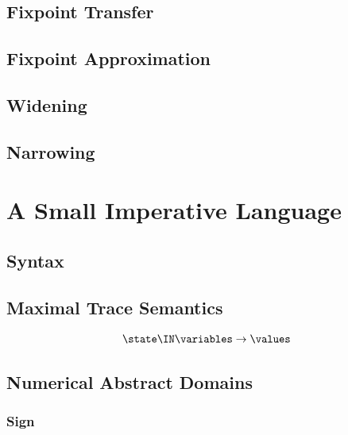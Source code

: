 \subsection{Fixpoint Transfer}

\subsection{Fixpoint Approximation}

\subsection{Widening}

\subsection{Narrowing}


\section{A Small Imperative Language}

\subsection{Syntax}

\subsection{Maximal Trace Semantics}


\begin{definition}[State]
  \begin{align*}
    \state \IN \variables \to \values
  \end{align*}
\end{definition}

\subsection{Numerical Abstract Domains}

\subsubsection*{Sign}

